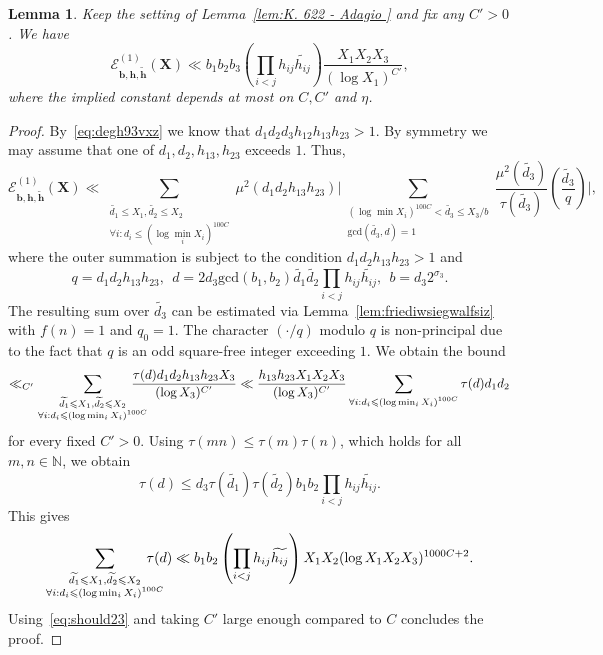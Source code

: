 \documentclass[a4paper,12pt,reqno]{amsart}
\numberwithin{equation}{section} \numberwithin{figure}{section}
\newcommand\N{\mathbb{N}}
\renewcommand{\l}{\left}
\renewcommand{\r}{\right}
\renewcommand{\b}{\mathbf}
\renewcommand{\c}{\mathcal}
\renewcommand{\gcd}{\textrm{gcd}}
\renewcommand{\leq}{\leqslant}
\renewcommand{\#}{\sharp}
\newtheorem{lemma}{Lemma}
\theoremstyle{definition}
\numberwithin{lemma}{section}
\begin{document}
\begin{lemma} \label     {lem:bvgt5iogln2}  
Keep the setting of Lemma~\ref{lem:K. 622 - Adagio } and  fix any $C'> 0 $.
We have 
 $$ \c {E}_{  \b b,\b h ,  \widetilde{\b h } }^{(1)}( \b X )
\ll
  b_1b_2b_3 \l(\prod_{i<j }h_{ij} \widetilde{   h_{ij}  }  \r)    \frac{X_1 X_2 X_3 }{ (\log X_1)^{C'}  }   ,$$
 where the implied constant depends at most on  $C, C'$ and $\eta$.  \end{lemma}
\begin{proof} By~\eqref{eq:degh93vxz}  
we know that 
$d_1 d_2 d_3 h_{12} h_{13} h_{23 } >1 $.
By symmetry we may assume that one of 
$d_1, d_2 ,h_{13} ,h_{23}  $ exceeds $1$.    
Thus, \[ \c {E}_{  \b b,\b h ,  \widetilde{\b h } }^{(1)}( \b X )\ll \sum_{\substack{ \widetilde{d_1} \leq X_1, \widetilde{d_2} \leq X _2\\ \forall i: d_i \leq (\log \min_i X_i)^{100C }}}  \mu^2(d_1   d_2   h_{13}  h_{23} ) 
\Bigg|
 \sum_{\substack{ (\log \min X_i)^{100C }  <   \widetilde{d_3}  \leq   X_3/b
  \\
\gcd(\widetilde{d_3} , d ) =1  }}
\frac{\mu^2(\widetilde{d_3} )}{\tau(   \widetilde{d_3}  )}  
  \l(\frac{        \widetilde{d_3}     }{q  }\r)   \Bigg|, \]where the outer  summation is subject to the condition $d_1d_2 h_{13} h_{23} >1$ and   
 $$q=d_1   d_2   h_{13}  h_{23}, \
\
d =2   d_3 \gcd(b_1,b_2)  \widetilde{d_1}\widetilde{d_2} \prod_{i<j }h_{ij} \widetilde{   h_{ij}  }   ,
\
\
b= d_3 2^{\sigma_3  }        .$$ 
The resulting sum over $\widetilde{d_3}  $  can   be estimated  via Lemma~\ref{lem:friediwsiegwalfsiz}
with $f(n)=1$ and  $q_0=1$. The character   $(\cdot/q)$  modulo $ q$  is    non-principal    due to  the fact that 
   $q$  is  an odd square-free integer  exceeding $1$. We obtain   the bound     \[ \ll_{C'}
 \sum_{\substack{ \widetilde{d_1} \leq X_1, \widetilde{d_2} \leq X _2\\ \forall i: d_i \leq (\log \min_i X_i)^{100C }}}  \hspace{-0,5cm}
 \frac{\tau(d) d_1d_2 h_{13} h_{23}   X_3 }{(\log X_3)^{C'}} 
\ll 
 \frac{  h_{13} h_{23}   X_1X_2 X_3 }{(\log X_3)^{C'}}
 \sum_{\substack{   \forall i: d_i \leq 
(\log \min_i X_i)^{100C }}} \tau(d) d_1d_2   \] for every fixed $C'>0$. 
Using  $\tau(mn) \leq \tau(m) \tau(n) $, which holds for all $m , n \in \N$,
we obtain  \[\tau(d) \leq    d_3 \tau( \widetilde{d_1})\tau( \widetilde{d_2} )b_1b_2\prod_{i<j }h_{ij} \widetilde{   h_{ij}  }   .\]
This gives  \[ \sum_{\substack{ \widetilde{d_1} \leq X_1, \widetilde{d_2} \leq X _2\\ \forall i: d_i \leq (\log \min_i X_i)^{100C }} } \hspace{-0,5cm}\tau(d)  
\ll     b_1b_2\l(\prod_{i<j }h_{ij} \widetilde{   h_{ij}  }  \r) X_1 X_2 (\log X_1 X_2 X_3 )^{1000 C +2 } .\] Using~\eqref{eq:should23}
and taking $C'$ large enough compared to $C$ concludes the proof.
 \end{proof}
\end{document}
